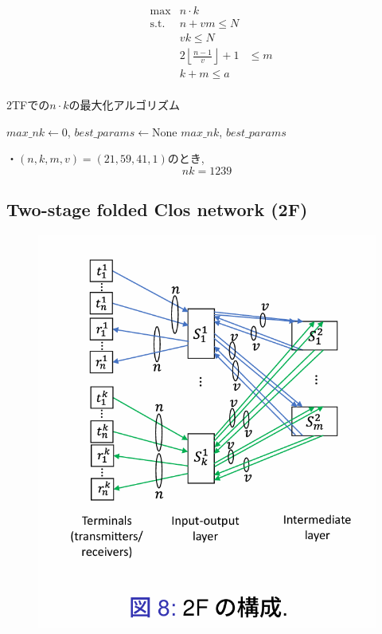 \documentclass[11pt, a4paper]{jarticle}
\begin{document}
\begin{align}
    & \max  &n \cdot k \\
    & \text{s.t.} & n + v m \leq N \\
    && v k \leq N \\
    && 2 \left\lfloor \frac{n-1}{v} \right\rfloor + 1 &\leq m \\
    && k + m \leq a\\
\end{align}

\begin{algorithm}[H]
    \caption{2TFでの$n \cdot k$の最大化アルゴリズム}
    $max\_nk \gets 0$, $best\_params \gets \text{None}$\;
    \Return $max\_nk$, $best\_params$\;
\end{algorithm}

・$(n, k, m, v) = (21, 59, 41, 1)$のとき, $$nk=1239$$

\subsection{Two-stage folded Clos network (2F)}

\begin{figure}[H]
    \centering
    \includegraphics[width=0.5\linewidth]{2f.png}
  \end{figure}
\end{document}
